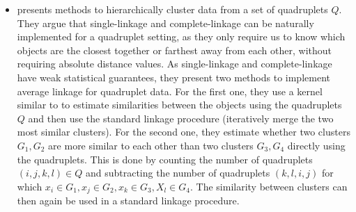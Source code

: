 \begin{itemize}
    \item %
        \cite{kleindessnerKernelFunctionsBased2017} presents methods to hierarchically cluster data from a set of quadruplets $Q$. They argue that single-linkage and complete-linkage can be
        naturally implemented for a quadruplet setting, as they only require us to know which objects are the closest together or farthest away from each other, without requiring
        absolute distance values. As single-linkage and complete-linkage have weak statistical guarantees, they present two methods to implement average linkage for quadruplet data. 
        For the first one, they use a kernel similar to \cite{kleindessnerKernelFunctionsBased2017} to estimate similarities between the objects using the quadruplets $Q$ and then use the standard
        linkage procedure (iteratively merge the two most similar clusters). For the second one, they estimate whether two clusters $G_1, G_2$ are more similar to each other than two clusters $G_3, G_4$ directly using the quadruplets. This is done
        by counting the number of quadruplets $(i,j,k,l) \in Q$ and subtracting the number of quadruplets $(k, l, i, j)$ for which $x_i \in G_1, x_j \in G_2, x_k \in G_3, X_l \in G_4$. 
        The similarity between clusters can then again be used in a standard linkage procedure.

\end{itemize}

